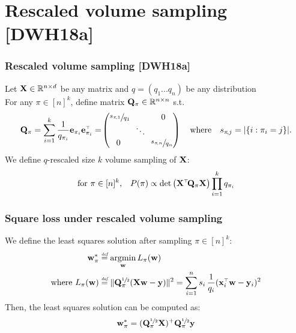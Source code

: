 \documentclass{beamer}
\begin{document}
\section{Rescaled volume sampling [DWH18a]}

\begin{frame}
\frametitle{Rescaled volume sampling [DWH18a]}
Let $\mathbf X\in\mathbb R^{n\times d}$ be any matrix and $q = (q_1...q_n)$ be any distribution\\
For any $\pi\in[n]^k$, define matrix $\mathbf Q_\pi\in\mathbb R^{n\times n}$ s.t.
\vspace{-2mm}
\[
\Q_\pi=\sum_{i=1}^k\frac{1}{q_{\pi_i}}\e_{\pi_i}\e_{\pi_i}^\top=\!\begin{pmatrix}
\sfrac{s_{\pi\!,1}}{q_1}\!\!&&0\\
&\ddots&\\
0&&\!\!\sfrac{s_{\pi\!,n}}{q_n}
\end{pmatrix}\quad\text{where}\quad s_{\pi\!,j}=|\{i:\pi_i=j\}|.
\]
We define $q$-rescaled size $k$ volume sampling of $\mathbf X$:
\begin{align*}
\text{for $\pi\in[n]^k$,}\quad
P(\pi) \propto \det\big(
\X^\top\!\Q_\pi\X\big) \prod_{i=1}^kq_{\pi_i}
\end{align*}
\end{frame}

\begin{frame}
\frametitle{Square loss under rescaled volume sampling}
We define the least squares solution after sampling $\pi\in[n]^k$:
\begin{align*}
\w_\pi^* &\defeq \argmin_\w L_\pi(\w)\\
\text{where }
L_\pi(\w)&\defeq\|\Q_\pi^{\sfrac{1}{2}}(\X\w - \y)\|^2=\sum_{i=1}^ns_i\,\frac{1}{q_i}(\x_i^\top\w-\y_i)^2
\end{align*}
Then, the least squares solution can be computed as:
\begin{align*}
\mathbf w_\pi^* = (\mathbf Q_\pi^{\sfrac{1}{2}}\mathbf X)^+\mathbf Q_\pi^{\sfrac{1}{2}}\mathbf y
\end{align*}
\end{frame}
\end{document}
